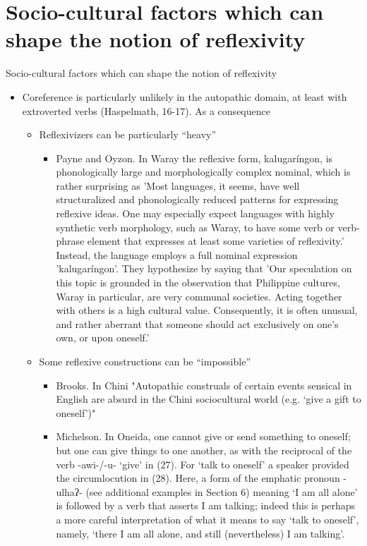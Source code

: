 \documentclass[output=paper]{langsci/langscibook}
\begin{document}

\section{Socio-cultural factors which can shape the notion of reflexivity}Socio-cultural factors which can shape the notion of reflexivity

\begin{itemize}
    \item Coreference is particularly unlikely in the autopathic domain, at least with extroverted verbs (Haspelmath, 16-17). As a consequence 
    \begin{itemize}
        \item Reflexivizers can be particularly “heavy” 
\begin{itemize}
\item Payne and Oyzon. In Waray the reflexive form, kalugaríngon, is phonologically large and morphologically complex nominal, which is rather surprising as 'Most languages, it seems, have well structuralized and phonologically reduced patterns for expressing reflexive ideas. One may especially expect languages with highly synthetic verb morphology, such as Waray, to have some verb or verb-phrase element that expresses at least some varieties of reflexivity.' Instead, the language employs a full nominal expression 'kalugaríngon'.
They hypothesize by saying that 'Our speculation on this topic is grounded in the observation that Philippine cultures, Waray in particular, are very communal societies. Acting together with others is a high cultural value. Consequently, it is often unusual, and rather aberrant that someone should act exclusively on one's own, or upon oneself.'\end{itemize}
\item Some reflexive constructions can be “impossible”
\begin{itemize}
    \item Brooks. In Chini "Autopathic construals of certain events sensical in English are absurd in the Chini sociocultural world (e.g. ‘give a gift to oneself’)"
\item Michelson. In Oneida, one cannot give or send something to oneself; but one can give things to one another, as with the reciprocal of the verb -awi-/-u- ‘give’ in (27). For ‘talk to oneself’ a speaker provided the circumlocution in (28). Here, a form of the emphatic pronoun -ulhaʔ- (see additional examples in Section 6) meaning ‘I am all alone’ is followed by a verb that asserts I am talking; indeed this is perhaps a more careful interpretation of what it means to say ‘talk to oneself’, namely, ‘there I am all alone, and still (nevertheless) I am talking’.

\end{itemize}
\end{itemize}
\end{itemize}
\end{document}

